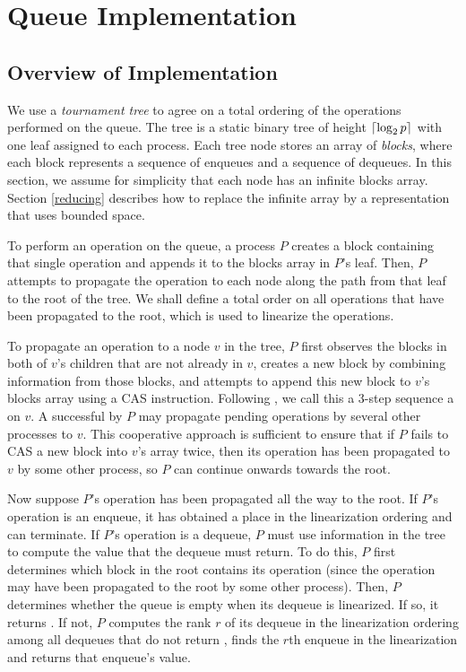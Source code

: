 
\section{Queue Implementation} \label{DescriptQ}

\subsection{Overview of Implementation}
We use a \emph{tournament tree} to agree on a total ordering of the operations performed on the queue.
The tree is a static binary tree of height $\lceil \log_2 p \rceil$ with one leaf 
assigned to each process. 
Each tree node  stores an array of \emph{blocks}, where each block represents a 
sequence of enqueues and a sequence of dequeues.
In this section, we assume for simplicity that each node has an infinite blocks array.
Section \ref{reducing} describes how to replace the infinite array by a representation that uses bounded space.

To perform an operation on the queue, a process $P$ creates a block containing that single 
operation and appends it to the blocks array in $P$'s leaf.
Then, $P$ attempts to propagate the operation to each node along the path from that leaf to the root of the tree.
We shall define a total order on all operations that have been propagated to the root, which is used to
linearize the operations.

To propagate an operation to a node $v$ in the tree, $P$ first observes
the blocks in both of $v$'s children that are not already in $v$,
creates a new block by combining information from those blocks, and attempts to append this 
new block to $v$'s blocks array using a CAS instruction.
Following \cite{}, we call this a 3-step sequence a
 on $v$. %
A successful  by $P$ may propagate pending operations by several other processes to $v$.
This cooperative approach is sufficient to ensure that if $P$ fails to CAS a 
new block into $v$'s array twice,
then its operation has been propagated to $v$ by some other process, so $P$ can continue 
onwards towards the root.

Now suppose $P$'s operation has been propagated all the way to the root.
If $P$'s operation is an enqueue, it has obtained a place in the linearization ordering and can terminate.
If $P$'s operation is a dequeue, $P$ must use information in the tree to compute the value that the
dequeue must return.  To do this, $P$ first determines which block in the root contains its operation
(since the operation may have been propagated to the root by some other process).
Then, $P$ determines whether the queue is empty when its dequeue is linearized. If so, it returns \nil.
If not, $P$ computes the rank $r$ of its dequeue in the linearization ordering
among all dequeues that do not return \nil,
finds the $r$th enqueue in the linearization and returns that enqueue's value.

